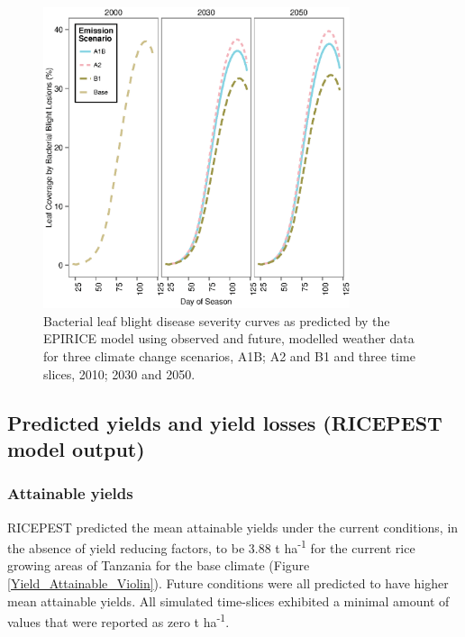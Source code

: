\documentclass[preprint,review,12pt]{elsarticle}
\begin{document}
    \begin{figure}[H]
      \includegraphics[width = 90mm]{figures/BB}
      \caption{Bacterial leaf blight disease severity curves as predicted by the EPIRICE model using observed and future, modelled weather data for three climate change scenarios, A1B; A2 and B1 and three time slices, 2010; 2030 and 2050.}
        \label{BBCurves}
    \end{figure}
    
    \subsection{Predicted yields and yield losses (RICEPEST model output)}
    \subsubsection{Attainable yields}
    RICEPEST predicted the mean attainable yields under the current conditions, in the absence of yield reducing factors, to be 3.88 t ha\textsuperscript{-1} for the current rice growing areas of Tanzania for the base climate (Figure \ref{Yield_Attainable_Violin}). Future conditions were all predicted to have higher mean attainable yields. All simulated time-slices exhibited a minimal amount of values that were reported as zero t ha\textsuperscript{-1}.
    
\end{document}
